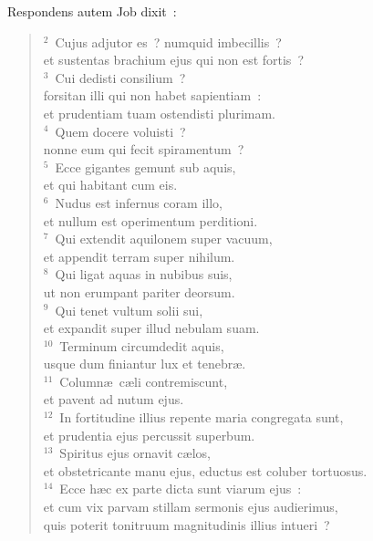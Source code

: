 \lettrine[lines=3,image=true,loversize=0.05,lraise=-0.03]{R}{}espondens autem Job dixit~:
\begin{flushleft}\begin{verse}\vspace{6pt}${}^{2}$~Cujus adjutor es~? numquid imbecillis~?\\ et sustentas brachium ejus qui non est fortis~?\\
${}^{3}$~Cui dedisti consilium~?\\ forsitan illi qui non habet sapientiam~:\\ et prudentiam tuam ostendisti plurimam.\\
${}^{4}$~Quem docere voluisti~?\\ nonne eum qui fecit spiramentum~?\\
${}^{5}$~Ecce gigantes gemunt sub aquis,\\ et qui habitant cum eis.\\
${}^{6}$~Nudus est infernus coram illo,\\ et nullum est operimentum perditioni.\\
${}^{7}$~Qui extendit aquilonem super vacuum,\\ et appendit terram super nihilum.\\
${}^{8}$~Qui ligat aquas in nubibus suis,\\ ut non erumpant pariter deorsum.\\
${}^{9}$~Qui tenet vultum solii sui,\\ et expandit super illud nebulam suam.\\
${}^{10}$~Terminum circumdedit aquis,\\ usque dum finiantur lux et tenebr\ae .\\
${}^{11}$~Column\ae\ c\ae li contremiscunt,\\ et pavent ad nutum ejus.\\
${}^{12}$~In fortitudine illius repente maria congregata sunt,\\ et prudentia ejus percussit superbum.\\
${}^{13}$~Spiritus ejus ornavit c\ae los,\\ et obstetricante manu ejus, eductus est coluber tortuosus.\\
${}^{14}$~Ecce h\ae c ex parte dicta sunt viarum ejus~:\\ et cum vix parvam stillam sermonis ejus audierimus,\\ quis poterit tonitruum magnitudinis illius intueri~?\end{verse}\end{flushleft}




